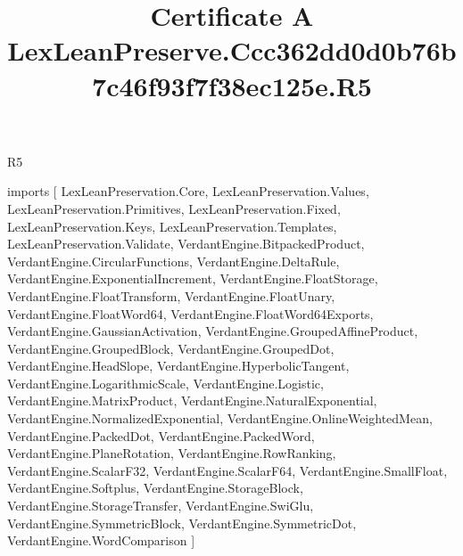 \begin{lexlean}{R5}
\title{Certificate A LexLeanPreserve.Ccc362dd0d0b76b7c46f93f7f38ec125e.R5}
\begin{coremodule}
imports [
  LexLeanPreservation.Core,
  LexLeanPreservation.Values,
  LexLeanPreservation.Primitives,
  LexLeanPreservation.Fixed,
  LexLeanPreservation.Keys,
  LexLeanPreservation.Templates,
  LexLeanPreservation.Validate,
  VerdantEngine.BitpackedProduct,
  VerdantEngine.CircularFunctions,
  VerdantEngine.DeltaRule,
  VerdantEngine.ExponentialIncrement,
  VerdantEngine.FloatStorage,
  VerdantEngine.FloatTransform,
  VerdantEngine.FloatUnary,
  VerdantEngine.FloatWord64,
  VerdantEngine.FloatWord64Exports,
  VerdantEngine.GaussianActivation,
  VerdantEngine.GroupedAffineProduct,
  VerdantEngine.GroupedBlock,
  VerdantEngine.GroupedDot,
  VerdantEngine.HeadSlope,
  VerdantEngine.HyperbolicTangent,
  VerdantEngine.LogarithmicScale,
  VerdantEngine.Logistic,
  VerdantEngine.MatrixProduct,
  VerdantEngine.NaturalExponential,
  VerdantEngine.NormalizedExponential,
  VerdantEngine.OnlineWeightedMean,
  VerdantEngine.PackedDot,
  VerdantEngine.PackedWord,
  VerdantEngine.PlaneRotation,
  VerdantEngine.RowRanking,
  VerdantEngine.ScalarF32,
  VerdantEngine.ScalarF64,
  VerdantEngine.SmallFloat,
  VerdantEngine.Softplus,
  VerdantEngine.StorageBlock,
  VerdantEngine.StorageTransfer,
  VerdantEngine.SwiGlu,
  VerdantEngine.SymmetricBlock,
  VerdantEngine.SymmetricDot,
  VerdantEngine.WordComparison
]


\end{coremodule}
\end{lexlean}
